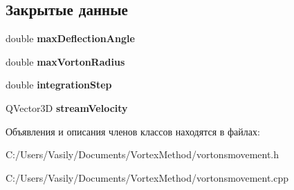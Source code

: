 \subsection*{Закрытые данные}
\begin{DoxyCompactItemize}
\item 
\mbox{\label{class_vortons_movement_a78b37b00fc61e6e3f00d11632acacc29}} 
double {\bfseries max\+Deflection\+Angle}
\item 
\mbox{\label{class_vortons_movement_a75a4fd9da8be2717ff74e825f36904f4}} 
double {\bfseries max\+Vorton\+Radius}
\item 
\mbox{\label{class_vortons_movement_accb85a93695605009668764e3d1fe64a}} 
double {\bfseries integration\+Step}
\item 
\mbox{\label{class_vortons_movement_a74859ca55dc1d673e50d98bde4a2a73f}} 
Q\+Vector3D {\bfseries stream\+Velocity}
\end{DoxyCompactItemize}


Объявления и описания членов классов находятся в файлах\+:\begin{DoxyCompactItemize}
\item 
C\+:/\+Users/\+Vasily/\+Documents/\+Vortex\+Method/vortonsmovement.\+h\item 
C\+:/\+Users/\+Vasily/\+Documents/\+Vortex\+Method/vortonsmovement.\+cpp\end{DoxyCompactItemize}
